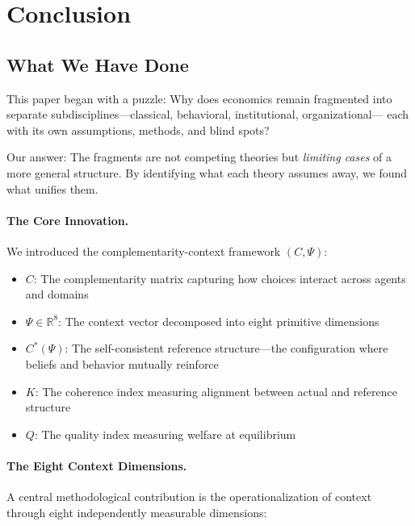 \section{Conclusion}
\label{sec:conclusion}

\subsection{What We Have Done}

This paper began with a puzzle: Why does economics remain fragmented
into separate subdisciplines---classical, behavioral, institutional, organizational---
each with its own assumptions, methods, and blind spots?

Our answer: The fragments are not competing theories but \emph{limiting cases}
of a more general structure. By identifying what each theory assumes away,
we found what unifies them.

\paragraph{The Core Innovation.}
We introduced the complementarity-context framework $(C, \Psi)$:
\begin{itemize}
  \item $C$: The complementarity matrix capturing how choices interact across agents and domains
  \item $\Psi \in \mathbb{R}^8$: The context vector decomposed into eight primitive dimensions
  \item $C^*(\Psi)$: The self-consistent reference structure---the configuration where 
        beliefs and behavior mutually reinforce
  \item $K$: The coherence index measuring alignment between actual and reference structure
  \item $Q$: The quality index measuring welfare at equilibrium
\end{itemize}

\paragraph{The Eight Context Dimensions.}
A central methodological contribution is the operationalization of context through eight independently measurable dimensions:

